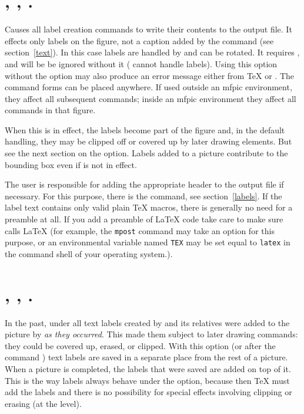 \documentclass[letterpaper]{article}
\begin{document}
\section{, ,
.}\label{mplabels}
%
%

Causes all label creation commands to write their contents to the output
file. It effects only labels on the figure, not a caption added by the
 command (see section~\ref{text}).  In this case labels are
handled by \MP{} and can be rotated. It requires \MP{}, and will be be
ignored without it (\MF{} cannot handle labels). Using this option
without the  option may also produce an error message
either from \TeX{} or \MF{}. The command forms can be placed anywhere.
If used outside an mfpic environment, they affect all subsequent
 commands; inside an mfpic environment they affect all
 commands in that figure.

When this is in effect, the labels become part of the figure and, in the
default handling, they may be clipped off or covered up by later drawing
elements. But see the next section on the  option.
Labels added to a picture contribute to the bounding box even if
 is not in effect.

The user is responsible for adding the appropriate 
header to the output file if necessary. For this purpose, there is the
 command, see section~\ref{labels}. If the label text
contains only valid plain \TeX{} macros, there is generally no need for
a  preamble at all. If you add a 
preamble of \LaTeX{} code take care to make sure \MP{} calls \LaTeX{}
(for example, the \texttt{mpost} command may take an option for this
purpose, or an environmental variable named \texttt{TEX} may be set
equal to \texttt{latex} in the command shell of your operating system.).

\section{, , .}
\label{overlaylabels}
%
%

In the past, under  all text labels created by 
and its relatives were added to the picture by \MP{} \emph{as they
occurred}. This made them subject to later drawing commands: they could
be covered up, erased, or clipped. With this option (or after the
command ) text labels are saved in a separate place
from the rest of a picture. When a picture is completed, the labels that
were saved are added on top of it. This is the way labels always behave
under the  option, because then \TeX{} must add the labels
and there is no possibility for special effects involving clipping or
erasing (at the \MF{} level).
\end{document}
